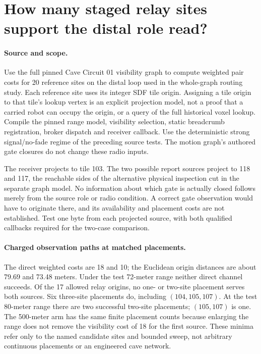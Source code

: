 \documentclass{article}
\begin{document}
\section*{How many staged relay sites support the distal role read?}
\paragraph{Source and scope.}
Use the full pinned Cave Circuit 01 visibility graph to compute
weighted pair costs for 20 reference sites on the distal
loop used in the whole-graph routing study. Each reference site
uses its integer SDF tile origin. Assigning a tile origin to that
tile's lookup vertex is an explicit projection model, not a proof
that a carried robot can occupy the origin, or a query of the
full historical voxel lookup. Compile the pinned range model,
visibility selection, static breadcrumb registration, broker
dispatch and receiver callback. Use the deterministic strong
signal/no-fade regime of the preceding source tests. The motion
graph's authored gate closures do not change these radio inputs.

The receiver projects to tile 103. The two possible report sources
project to 118 and 117, the reachable sides of the alternative
physical inspection cut in the separate graph model. No information
about which gate is actually closed follows merely from the source
role or radio condition. A correct gate observation would have to
originate there, and its availability and placement costs are not
established. Test one byte from each projected source, with both
qualified callbacks required for the two-case comparison.

\paragraph{Charged observation paths at matched placements.}
The direct weighted costs are 18 and 10; the Euclidean origin
distances are about 79.69 and 73.48 meters. Under the test 72-meter
range neither direct channel succeeds. Of the 17 allowed relay
origins, no one- or two-site placement serves both sources.
Six three-site placements do, including $(104,105,107)$.
At the test 80-meter range there are two successful two-site
placements; $(105,107)$ is one. The 500-meter arm has the same
finite placement counts because enlarging the range does not
remove the visibility cost of 18 for the first source. These
minima refer only to the named candidate sites and bounded sweep,
not arbitrary continuous placements or an engineered cave network.
\end{document}
